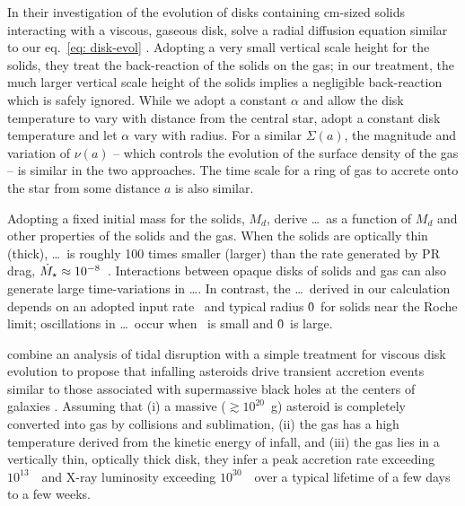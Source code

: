 \documentclass[12pt,preprint]{aastex}
\begin{document}
In their investigation of the evolution of disks containing cm-sized solids interacting 
with a viscous, gaseous disk, \citet{metzger2012} solve a radial diffusion equation similar 
to our eq.~\ref{eq: disk-evol} \citep[see also][]{rafikov2011a,rafikov2011b,bochkarev2011,
rafikov2012}. Adopting a very small vertical scale height for the solids, they treat the
back-reaction of the solids on the gas; in our treatment, the much larger vertical scale
height of the solids implies a negligible back-reaction which is safely ignored. While we
adopt a constant $\alpha$ and allow the disk temperature to vary with distance from the
central star, \citet{metzger2012} adopt a constant disk temperature and let $\alpha$ vary 
with radius. For a similar $\Sigma (a)$, the magnitude and variation of $\nu(a)$ -- which 
controls the evolution of the surface density of the gas -- is similar in the two approaches. 
The time scale for a ring of gas to accrete onto the star from some distance $a$ is also similar.

Adopting a fixed initial mass for the solids, $M_d$, \citet{metzger2012} derive \mdots\ as
a function of $M_d$ and other properties of the solids and the gas. When the solids are
optically thin (thick), \mdots\ is roughly 100 times smaller (larger) than the rate generated 
by PR drag, $\mdots \approx 10^{-8}$~\gs.  Interactions between opaque disks of solids and 
gas can also generate large time-variations in \mdots.  In contrast, the \mdots\ derived in 
our calculation depends on an adopted input rate \mdotz\ and typical radius \r0\ for solids 
near the Roche limit; oscillations in \mdots\ occur when \mdotz\ is small and \r0\ is large.

\citet{bear2013} combine an analysis of tidal disruption \citep[similar to][]{brown2017} 
with a simple treatment for viscous disk evolution \citep[compared to][]{metzger2012} to
propose that infalling asteroids drive transient accretion events similar to those associated 
with supermassive black holes at the centers of galaxies \citep[e.g.,][and references 
therein]{rees1988,cannizzo1990,gezari2009,lodato2011,bromley2012,kochanek2016}. Assuming that 
(i) a massive ($\gtrsim 10^{20}$~g) asteroid is completely converted into gas by collisions and 
sublimation, (ii) the gas has a high temperature derived from the kinetic energy of infall, and 
(iii) the gas lies in a vertically thin, optically thick disk, they infer a peak accretion rate 
exceeding $10^{13}$~\gs\ and X-ray luminosity exceeding $10^{30}$~\ergs\ over a typical lifetime 
of a few days to a few weeks.
\end{document}
